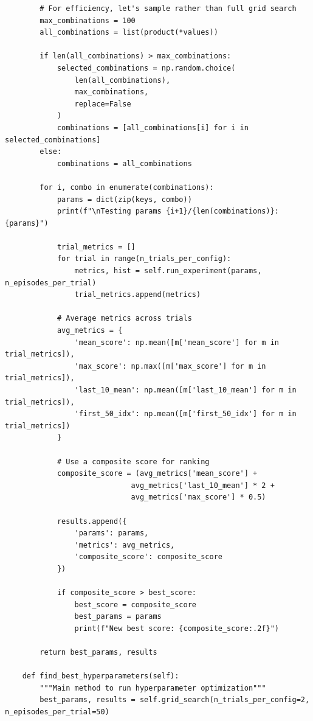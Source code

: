 \documentclass[submit]{../harvardml}
\begin{document}
\begin{lstlisting}
        # For efficiency, let's sample rather than full grid search
        max_combinations = 100
        all_combinations = list(product(*values))
        
        if len(all_combinations) > max_combinations:
            selected_combinations = np.random.choice(
                len(all_combinations), 
                max_combinations, 
                replace=False
            )
            combinations = [all_combinations[i] for i in selected_combinations]
        else:
            combinations = all_combinations
        
        for i, combo in enumerate(combinations):
            params = dict(zip(keys, combo))
            print(f"\nTesting params {i+1}/{len(combinations)}: {params}")
            
            trial_metrics = []
            for trial in range(n_trials_per_config):
                metrics, hist = self.run_experiment(params, n_episodes_per_trial)
                trial_metrics.append(metrics)
                
            # Average metrics across trials
            avg_metrics = {
                'mean_score': np.mean([m['mean_score'] for m in trial_metrics]),
                'max_score': np.max([m['max_score'] for m in trial_metrics]),
                'last_10_mean': np.mean([m['last_10_mean'] for m in trial_metrics]),
                'first_50_idx': np.mean([m['first_50_idx'] for m in trial_metrics])
            }
            
            # Use a composite score for ranking
            composite_score = (avg_metrics['mean_score'] + 
                             avg_metrics['last_10_mean'] * 2 + 
                             avg_metrics['max_score'] * 0.5)
            
            results.append({
                'params': params,
                'metrics': avg_metrics,
                'composite_score': composite_score
            })
            
            if composite_score > best_score:
                best_score = composite_score
                best_params = params
                print(f"New best score: {composite_score:.2f}")
        
        return best_params, results
    
    def find_best_hyperparameters(self):
        """Main method to run hyperparameter optimization"""
        best_params, results = self.grid_search(n_trials_per_config=2, n_episodes_per_trial=50)
        

\end{lstlisting}
\end{document}
